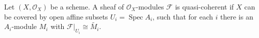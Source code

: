 Let $(X, \mathcal{O}_X)$ be a scheme. A sheaf of $\mathcal{O}_X$-modules $\mathcal{F}$ is quasi-coherent if $X$ can be covered by open affine subsets $U_i = \operatorname{Spec} A_i$, such that for each $i$ there is an $A_i$-module $M_i$ with $\mathcal{F}|_{U_i} \cong \widetilde{M_i}$.
